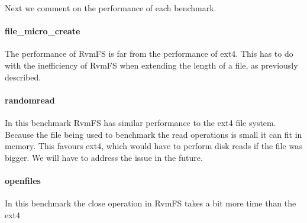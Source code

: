 Next we comment on the performance of each benchmark.

\paragraph{\bf file\_micro\_create}
The performance of RvmFS is far from the performance of ext4. This has to do with the inefficiency of RvmFS when extending the length of a file, as previously described.
\paragraph{\bf randomread} 
In this benchmark RvmFS has similar performance to the ext4 file system. Because the file being used to benchmark the read operations is small it can fit in memory. This favours ext4, which would have to perform disk reads if the file was bigger.
We will have to address the issue in the future.
\paragraph{\bf openfiles} 
In this benchmark the close operation in RvmFS takes a bit more time than the ext4




%
